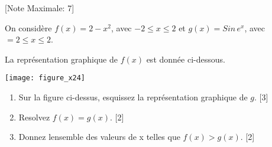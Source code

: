 \begin{question}
  \hspace*{\fill} [Note Maximale: 7]\par
  \medskip
  \noindent On considère $f(x) = 2 - x^2$, avec $-2 \le x \le 2$ et $g(x)= Sin\,e^x$, avec $=2 \le x \le 2$.\par
  \medskip
  \begin{center} %
    \noindent La représentation graphique de $f(x)$ est donnée ci-dessous.\par
    \texttt{[image: figure\_x24]}\par
  \end{center} %
  \begin{enumerate}[label=(\alph*)]
    \item Sur la figure ci-dessus, esquissez la représentation graphique de $g$.\hspace*{\fill} [3]
    \item Resolvez $f(x) = g(x)$.\hspace*{\fill} [2]
    \item Donnez lensemble des valeurs de x telles que $f(x) > g(x)$.\hspace*{\fill} [2]
  \end{enumerate}
\end{question}
